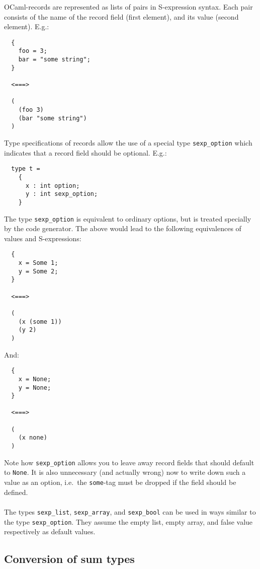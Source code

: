 \documentclass[a4paper]{article}
\begin{document}
OCaml-records are represented as lists of pairs in S-expression syntax.
Each pair consists of the name of the record field (first element),
and its value (second element).  E.g.:

\begin{verbatim}
  {
    foo = 3;
    bar = "some string";
  }

  <===>

  (
    (foo 3)
    (bar "some string")
  )
\end{verbatim}

Type specifications of records allow the use of a special type
\verb=sexp_option= which indicates that a record field should be optional.
E.g.:

\begin{verbatim}
  type t =
    {
      x : int option;
      y : int sexp_option;
    }
\end{verbatim}

The type \verb=sexp_option= is equivalent to ordinary options, but is
treated specially by the code generator.  The above would lead to the
following equivalences of values and S-expressions:

\begin{verbatim}
  {
    x = Some 1;
    y = Some 2;
  }

  <===>

  (
    (x (some 1))
    (y 2)
  )
\end{verbatim}

\noindent And:

{\samepage
\begin{verbatim}
  {
    x = None;
    y = None;
  }

  <===>

  (
    (x none)
  )
\end{verbatim}
}

Note how \verb=sexp_option= allows you to leave away record fields
that should default to \verb=None=.  It is also unnecessary (and
actually wrong) now to write down such a value as an option, i.e.\
the \verb=some=-tag must be dropped if the field should be defined.\\
\\
The types \verb=sexp_list=, \verb=sexp_array=, and \verb=sexp_bool= can be
used in ways similar to the type \verb=sexp_option=.  They assume the empty
list, empty array, and false value respectively as default values.

\subsection{Conversion of sum types}
\end{document}
